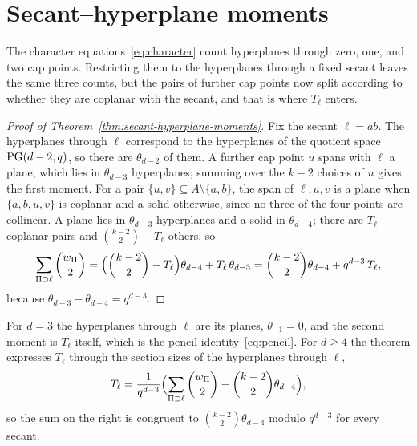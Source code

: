 \section{Secant--hyperplane moments}
\label{sec:moments}

The character equations~\eqref{eq:character} count hyperplanes through
zero, one, and two cap points.  Restricting them to the hyperplanes
through a fixed secant leaves the same three counts, but the pairs of
further cap points now split according to whether they are coplanar with
the secant, and that is where \(T_\ell\) enters.

\begin{proof}[Proof of Theorem~\ref{thm:secant-hyperplane-moments}]
Fix the secant \(\ell=ab\).  The hyperplanes through \(\ell\) correspond
to the hyperplanes of the quotient space \(\mathrm{PG}(d-2,q)\), so there are
\(\theta_{d-2}\) of them.  A further cap point \(u\) spans with \(\ell\) a
plane, which lies in \(\theta_{d-3}\) hyperplanes; summing over the
\(k-2\) choices of \(u\) gives the first moment.  For a pair
\(\{u,v\}\subseteq A\setminus\{a,b\}\), the span of \(\ell,u,v\) is a
plane when \(\{a,b,u,v\}\) is coplanar and a solid otherwise, since no
three of the four points are collinear.  A plane lies in
\(\theta_{d-3}\) hyperplanes and a solid in \(\theta_{d-4}\); there are
\(T_\ell\) coplanar pairs and \(\binom{k-2}{2}-T_\ell\) others, so
\[
 \sum_{\Pi\supset\ell}\binom{w_\Pi}{2}
 =\Bigl(\binom{k-2}{2}-T_\ell\Bigr)\theta_{d-4}+T_\ell\,\theta_{d-3}
 =\binom{k-2}{2}\theta_{d-4}+q^{d-3}\,T_\ell,
\]
because \(\theta_{d-3}-\theta_{d-4}=q^{d-3}\).
\end{proof}

For \(d=3\) the hyperplanes through \(\ell\) are its planes,
\(\theta_{-1}=0\), and the second moment is \(T_\ell\) itself, which is
the pencil identity~\eqref{eq:pencil}.  For \(d\ge4\) the theorem
expresses \(T_\ell\) through the section sizes of the hyperplanes through
\(\ell\),
\begin{equation}
 T_\ell=\frac1{q^{d-3}}\Bigl(\sum_{\Pi\supset\ell}\binom{w_\Pi}{2}-\binom{k-2}{2}\theta_{d-4}\Bigr),
\label{eq:T-from-sections}
\end{equation}
so the sum on the right is congruent to \(\binom{k-2}{2}\theta_{d-4}\)
modulo \(q^{d-3}\) for every secant.

